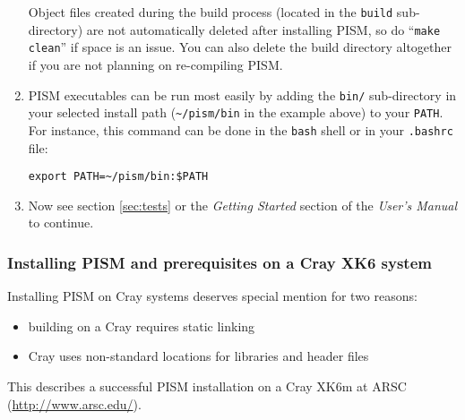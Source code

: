 \documentclass[titlepage,letterpaper,final]{scrartcl}
\begin{document}
\begin{enumerate}
Object files created during the build process (located in the \texttt{build}
sub-directory) are not automatically deleted after installing PISM, so do ``\texttt{make
  clean}'' if space is an issue. You can also delete the build
directory altogether if you are not planning on re-compiling PISM.

\item PISM executables can be run most easily by adding the \texttt{bin/}
  sub-directory in your selected install path
  (\texttt{\textasciitilde/pism/bin} in the example above) to your
  \texttt{PATH}. For instance, this command can be done in the \texttt{bash}
  shell or in your \texttt{.bashrc} file:
\begin{verbatim}
export PATH=~/pism/bin:$PATH
\end{verbatim}

\item Now see section \ref{sec:tests} or the \emph{Getting Started} section of the \emph{User's Manual} to continue.
\end{enumerate}

\subsubsection{Installing PISM and prerequisites on a Cray XK6 system}
\label{subsec:cray}

Installing PISM on Cray systems deserves special mention for two reasons:
\begin{itemize}
\item building on a Cray requires static linking
\item Cray uses non-standard locations for libraries and header files
\end{itemize}
This describes a successful PISM installation on a Cray XK6m at ARSC (\url{http://www.arsc.edu/}).
\end{document}
